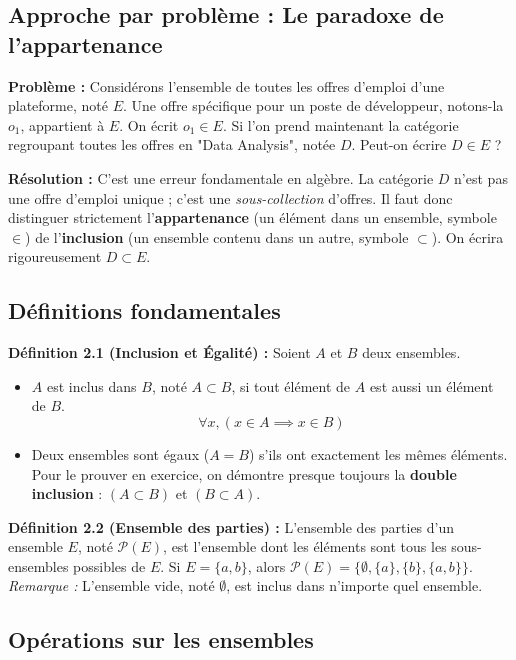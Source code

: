 \documentclass[12pt,a4paper]{report}
\begin{document}
\subsection{Approche par problème : Le paradoxe de l'appartenance}
\textbf{Problème :} Considérons l'ensemble de toutes les offres d'emploi d'une plateforme, noté $E$. Une offre spécifique pour un poste de développeur, notons-la $o_1$, appartient à $E$. On écrit $o_1 \in E$. Si l'on prend maintenant la catégorie regroupant toutes les offres en "Data Analysis", notée $D$. Peut-on écrire $D \in E$ ?

\textbf{Résolution :} C'est une erreur fondamentale en algèbre. La catégorie $D$ n'est pas une offre d'emploi unique ; c'est une \textit{sous-collection} d'offres. Il faut donc distinguer strictement l'\textbf{appartenance} (un élément dans un ensemble, symbole $\in$) de l'\textbf{inclusion} (un ensemble contenu dans un autre, symbole $\subset$). On écrira rigoureusement $D \subset E$.

\subsection{Définitions fondamentales}
\textbf{Définition 2.1 (Inclusion et Égalité) :}
Soient $A$ et $B$ deux ensembles.
\begin{itemize}
    \item $A$ est inclus dans $B$, noté $A \subset B$, si tout élément de $A$ est aussi un élément de $B$.
    $$ \forall x, (x \in A \implies x \in B) $$
    \item Deux ensembles sont égaux ($A = B$) s'ils ont exactement les mêmes éléments. Pour le prouver en exercice, on démontre presque toujours la \textbf{double inclusion} : $(A \subset B)$ et $(B \subset A)$.
\end{itemize}

\textbf{Définition 2.2 (Ensemble des parties) :}
L'ensemble des parties d'un ensemble $E$, noté $\mathcal{P}(E)$, est l'ensemble dont les éléments sont tous les sous-ensembles possibles de $E$.
Si $E = \{a, b\}$, alors $\mathcal{P}(E) = \{\emptyset, \{a\}, \{b\}, \{a, b\}\}$.
\textit{Remarque :} L'ensemble vide, noté $\emptyset$, est inclus dans n'importe quel ensemble.

\subsection{Opérations sur les ensembles}
\end{document}
